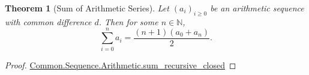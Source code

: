 \documentclass{article}
\newtheorem{theorem}{Theorem}
\begin{document}
\begin{theorem}[Sum of Arithmetic Series]

Let $(a_i)_{i \geq 0}$ be an arithmetic sequence with common difference $d$.
Then for some $n \in \mathbb{N}$,
$$\sum_{i=0}^n a_i = \frac{(n + 1)(a_0 + a_n)}{2}.$$

\end{theorem}

\begin{proof}

\href{Arithmetic.lean}{Common.Sequence.Arithmetic.sum\_recursive\_closed}

\end{proof}
\end{document}
